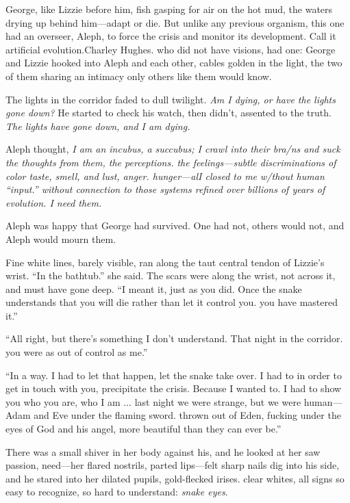 George, like Lizzie before him, fish gasping for air on the hot mud, the waters drying up behind him—adapt or die. But unlike any previous organism, this one had an overseer, Aleph, to force the crisis and monitor its development. Call it artificial evolution.Charley Hughes. who did not have visions, had one: George and Lizzie hooked into Aleph and each other, cables golden in the light, the two of them sharing an intimacy only others like them would know.

The lights in the corridor faded to dull twilight. \textit{Am I dying, or have the lights gone down?} He started to check his watch, then didn't, assented to the truth. \textit{The lights have gone down, and I am dying.}

Aleph thought, \textit{I am an incubus, a succubus; I crawl into their bra/ns and suck the thoughts from them, the perceptions. the feelings—subtle discriminations of color taste, smell, and lust, anger. hunger—alI closed to me w/thout human ``input.'' without connection to those systems refined over billions of years of evolution. I need them.}

Aleph was happy that George had survived. One had not, others would not, and Aleph would mourn them.

Fine white lines, barely visible, ran along the taut central tendon of Lizzie's wrist. ``In the bathtub.'' she said. The scars were along the wrist, not across it, and must have gone deep. ``I meant it, just as you did. Once the snake understands that you will die rather than let it control you. you have mastered it.''

``All right, but there's something I don't understand. That night in the corridor. you were as out of control as me.''

``In a way. I had to let that happen, let the snake take over. I had to in order to get in touch with you, precipitate the crisis. Because I wanted to. I had to show you who you are, who I am ... last night we were strange, but we were human—Adam and Eve under the flaming sword. thrown out of Eden, fucking under the eyes of God and his angel, more beautiful than they can ever be.''

There was a small shiver in her body against his, and he looked at her saw passion, need—her flared nostrils, parted lips—felt sharp nails dig into his side, and he stared into her dilated pupils, gold-flecked irises. clear whites, all signs so easy to recognize, so hard to understand: \textit{snake eyes}.     